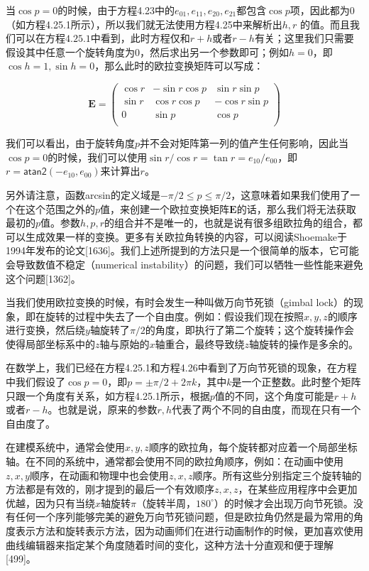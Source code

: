 \documentclass[
  paper=a4,
  ,captions=tableheading
]{scrartcl}
\begin{document}
当\(\cos p = 0\)的时候，由于方程4.23中的\(e_{01},e_{11},e_{20},e_{21}\)都包含\(\cos p\)项，因此都为0（如方程4.25.1所示），所以我们就无法使用方程4.25中来解析出\(h,r\)
的值。而且我们可以在方程\(4.25.1\)中看到，此时方程仅和\(r+h\)或者\(r-h\)有关；这里我们只需要假设其中任意一个旋转角度为0，然后求出另一个参数即可；例如\(h = 0\)，即\(\cos h = 1,\sin h =0\)，那么此时的欧拉变换矩阵可以写成：

\[
  \mathbf{E}=
  \left(
  \begin{array}{ccc}
      \cos r & -\sin r \cos p & \sin r \sin p   \\
      \sin r & \cos r \cos p  & - \cos r \sin p \\
      0      & \sin p         & \cos p          \\
    \end{array}
  \right)
  \tag{4.26}
\]

我们可以看出，由于旋转角度\(p\)并不会对矩阵第一列的值产生任何影响，因此当\(\cos p = 0\)的时候，我们可以使用\(\sin r / \cos r = \tan r = e_{10} / e_{00}\)，即\(r = \mathsf{atan2}(-e_{10},e_{00})\)来计算出\(r\)。

另外请注意，函数arcsin的定义域是\(-\pi/2 \le p \le \pi/2\)，这意味着如果我们使用了一个在这个范围之外的\(p\)值，来创建一个欧拉变换矩阵\(\mathbf{E}\)的话，那么我们将无法获取最初的\(p\)值。参数\(h,p,r\)的组合并不是唯一的，也就是说有很多组欧拉角的组合，都可以生成效果一样的变换。更多有关欧拉角转换的内容，可以阅读Shoemake于1994年发布的论文{[}1636{]}。我们上述所提到的方法只是一个很简单的版本，它可能会导致数值不稳定（numerical
instability）的问题，我们可以牺牲一些性能来避免这个问题{[}1362{]}。

当我们使用欧拉变换的时候，有时会发生一种叫做万向节死锁（gimbal
lock）的现象，即在旋转的过程中失去了一个自由度。例如：假设我们现在按照\(x,y,z\)的顺序进行变换，然后绕\(y\)轴旋转了\(\pi/2\)的角度，即执行了第二个旋转；这个旋转操作会使得局部坐标系中的\(z\)轴与原始的\(x\)轴重合，最终导致绕\(z\)轴旋转的操作是多余的。

在数学上，我们已经在方程4.25.1和方程4.26中看到了万向节死锁的现象，在方程中我们假设了\(\cos p = 0 \)，即\(p = \pm  \pi/2 + 2\pi k\)，其中\(k\)是一个正整数。此时整个矩阵只跟一个角度有关系，如方程4.25.1所示，根据\(p\)值的不同，这个角度可能是\(r+h\)或者\(r-h\)。也就是说，原来的参数\(r,h\)代表了两个不同的自由度，而现在只有一个自由度了。

在建模系统中，通常会使用\(x,y,z\)顺序的欧拉角，每个旋转都对应着一个局部坐标轴。在不同的系统中，通常都会使用不同的欧拉角顺序，例如：在动画中使用\(z,x,y\)顺序，在动画和物理中也会使用\(z,x,z\)顺序。所有这些分别指定三个旋转轴的方法都是有效的，刚才提到的最后一个有效顺序\(z,x,z\)，在某些应用程序中会更加优越，因为只有当绕\(x\)轴旋转\(\pi\)（旋转半周，\(180^{\circ}\)）的时候才会出现万向节死锁。没有任何一个序列能够完美的避免万向节死锁问题，但是欧拉角仍然是最为常用的角度表示方法和旋转表示方法，因为动画师们在进行动画制作的时候，更加喜欢使用曲线编辑器来指定某个角度随着时间的变化，这种方法十分直观和便于理解{[}499{]}。
\end{document}
